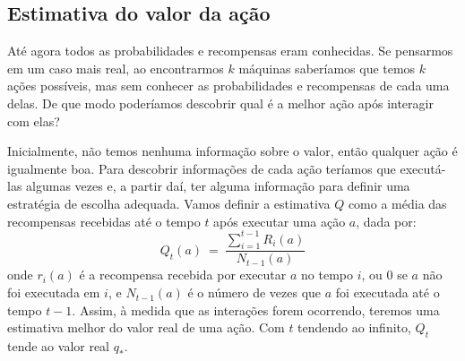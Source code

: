 \documentclass{article}
\begin{document}
        \subsection{Estimativa do valor da ação}

            Até agora todos as probabilidades e recompensas eram conhecidas. Se pensarmos em um caso mais real, ao encontrarmos $k$ máquinas saberíamos que temos $k$ ações possíveis, mas sem conhecer as probabilidades e recompensas de cada uma delas. De que modo poderíamos descobrir qual é a melhor ação após interagir com elas?

            Inicialmente, não temos nenhuma informação sobre o valor, então qualquer ação é igualmente boa. Para descobrir informações de cada ação teríamos que executá-las algumas vezes e, a partir daí, ter alguma informação para definir uma estratégia de escolha adequada. Vamos definir a estimativa $Q$ como a média das recompensas recebidas até o tempo $t$ após executar uma ação $a$, dada por:
            \begin{equation}
            \label{eq:estimativa-acao}
                Q_t(a) \ = \ \frac{\sum\limits_{i=1}^{t-1} R_i(a)}{N_{t-1}(a)}
            \end{equation}
            onde $r_i(a)$ é a recompensa recebida por executar $a$ no tempo $i$, ou $0$ se $a$ não foi executada em $i$, e $N_{t-1}(a)$ é o número de vezes que $a$ foi executada até o tempo $t-1$. Assim, à medida que as interações forem ocorrendo, teremos uma estimativa melhor do valor real de uma ação. Com $t$ tendendo ao infinito, $Q_t$ tende ao valor real $q_*$.
\end{document}
